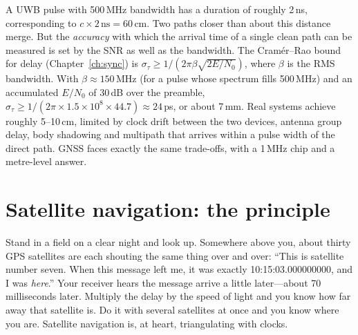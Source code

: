 \begin{worked}
A UWB pulse with 500\,MHz bandwidth has a duration of roughly 2\,ns, corresponding to
$c\times2\,\text{ns}=60$\,cm. Two paths closer than about this distance merge. But the
\emph{accuracy} with which the arrival time of a single clean path can be measured is
set by the SNR as well as the bandwidth. The Cram\'er--Rao bound for delay
(Chapter~\ref{ch:sync}) is $\sigma_\tau\ge1/(2\pi\beta\sqrt{2E/N_0})$, where $\beta$ is the RMS
bandwidth. With $\beta\approx150$\,MHz (for a pulse whose spectrum fills 500\,MHz) and an
accumulated $E/N_0$ of 30\,dB over the preamble, $\sigma_\tau\ge1/(2\pi\times1.5\times10^8\times
44.7)\approx24$\,ps, or about 7\,mm. Real systems achieve roughly 5--10\,cm, limited by
clock drift between the two devices, antenna group delay, body shadowing and multipath that
arrives within a pulse width of the direct path. GNSS faces exactly the same trade-offs, with
a 1\,MHz chip and a metre-level answer.
\end{worked}


\section{Satellite navigation: the principle}
\label{sec:ch18:gnss}

Stand in a field on a clear night and look up. Somewhere above you, about thirty GPS satellites are
each shouting the same thing over and over: ``This is satellite number seven. When this message
left me, it was exactly 10:15:03.000000000, and I was \emph{here}.'' Your receiver hears the
message arrive a little later---about 70 milliseconds later. Multiply the delay by the speed of
light and you know how far away that satellite is. Do it with several satellites at once and you
know where you are. Satellite navigation is, at heart, triangulating with clocks.

